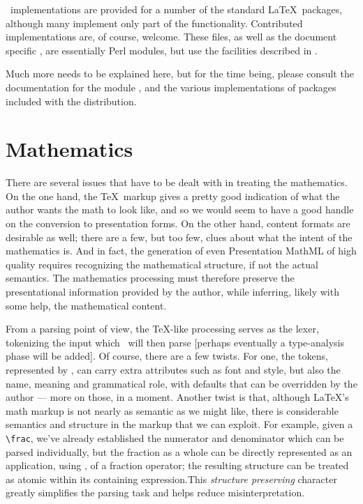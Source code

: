 \documentclass{report}
\begin{document}
\LaTeXML\ implementations are provided for a number of the standard \LaTeX\ packages,
although many implement only part of the functionality.  Contributed implementations are,
of course, welcome.  These files, as well as the document specific ,
are essentially Perl modules, but use the facilities described in .

Much more needs to be explained here, but for the time being,
please consult the documentation for the module , and
the various implementations of packages included with the distribution.

\chapter{Mathematics}\label{math}
There are several issues that have to be dealt with in treating the mathematics.
On the one hand, the \TeX\ markup gives a pretty good indication of what the
author wants the math to look like, and so we would seem to have a good handle
on the conversion to presentation forms.  On the other hand, content formats
are desirable as well; there are a few, but too few, clues about what the
intent of the mathematics is.  And in fact, the generation of even Presentation
MathML of high quality requires recognizing the mathematical structure, if not
the actual semantics. The mathematics processing must therefore preserve the
presentational information provided by the author, while inferring, likely
with some help, the mathematical content.

From a parsing point of view, the \TeX-like processing serves as the lexer,
tokenizing the input which \LaTeXML\ will then parse
[perhaps eventually a type-analysis phase will be added].
Of course, there are a few twists.
For one, the tokens, represented by , can carry extra attributes
such as font and style, but also the name, meaning and grammatical role,
with defaults that can be overridden by the author --- more on those, in a moment.
Another twist is that, although \LaTeX's math markup is not nearly
as semantic as we might like, there is considerable semantics and structure in the 
markup that we can exploit. For example, given a \verb|\frac|, we've already
established the numerator and denominator which can be parsed individually,
but the fraction as a whole can be directly represented as an application,
using , of a fraction operator; the resulting structure can be treated
as atomic within its containing expression.This \emph{structure preserving} character
greatly simplifies the parsing task and helps reduce misinterpretation.
\end{document}

